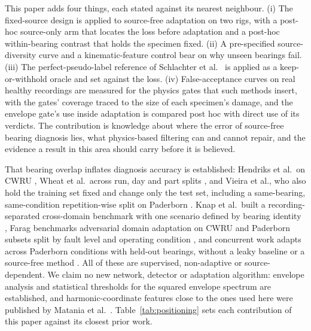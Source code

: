 This paper adds four things, each stated against its nearest neighbour. (i) The fixed-source design is applied to
source-free adaptation on two rigs, with a post-hoc source-only arm that locates the loss before adaptation and a post-hoc
within-bearing contrast that holds the specimen fixed. (ii) A pre-specified source-diversity curve and a kinematic-feature control bear
on why unseen bearings fail. (iii) The perfect-pseudo-label reference of Schlachter et al.\ \cite{schlachter2025} is
applied as a keep-or-withhold oracle and set against the loss. (iv) False-acceptance curves on real healthy recordings are
measured for the physics gates that such methods insert, with the gates' coverage traced to the size of each specimen's
damage, and the envelope gate's use inside adaptation is compared post hoc with direct use of its verdicts. The contribution is knowledge about where the error of source-free bearing diagnosis lies, what physics-based
filtering can and cannot repair, and the evidence a result in this area should carry before it is believed.

That bearing overlap inflates diagnosis accuracy is established: Hendriks et al.\ on CWRU \cite{hendriks2022}, Wheat et
al.\ across run, day and part splits \cite{wheat2024leakage}, and Vieira et al., who also hold the training set fixed and
change only the test set, including a same-bearing, same-condition repetition-wise split on Paderborn
\cite[Section~6.2]{vieira2026}. Knap et al.\ built a recording-separated cross-domain benchmark with one scenario defined by bearing
identity \cite{knap2026leakagesafe}, Farag benchmarks adversarial domain adaptation on CWRU and Paderborn subsets split by
fault level and operating condition \cite{farag2025benchmark}, and concurrent work adapts across Paderborn conditions with
held-out bearings, without a leaky baseline or a source-free method \cite{nagaswetha2026}. All of these are supervised,
non-adaptive or source-dependent. We claim no new network, detector or adaptation algorithm: envelope analysis
\cite{randall2011} and statistical thresholds for the squared envelope spectrum \cite{borghesani2013} are established, and
harmonic-coordinate features close to the ones used here were published by Matania et al.\ \cite{matania2025}.
Table~\ref{tab:positioning} sets each contribution of this paper against its closest prior work.
